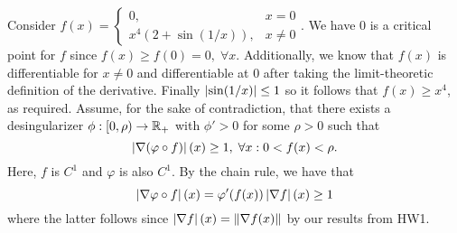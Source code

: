 \documentclass[10pt]{article}
\begin{document}
Consider $f(x) = \begin{cases}
    0, & x = 0 \\
    x^4(2 + \sin(1/x)), & x \neq 0
\end{cases}$. We have $0$ is a critical point for $f$ since $f(x) \geq f(0) =
0, \; \forall x$. Additionally, we know that $f(x)$ is differentiable for $x
\neq 0$ and differentiable at $0$ after taking the limit-theoretic definition
of the derivative. Finally $\left| \sin(1/x) \right| \leq 1$ so it follows that $f(x)
\geq x^4$, as required. Assume, for the sake of contradiction, that there
exists a desingularizer $\phi: [0, \rho)
\to \mathbb{R}_+$ with $\phi' > 0$ for some $\rho > 0$ such that
\[
    \left| \nabla (\varphi \circ f) \right|(x) \geq 1, \; \forall x: 0 < f(x)
    < \rho.
\]
Here, $f$ is $C^1$ and $\varphi$ is also $C^1$. By the chain rule, we have that
\[
    \left| \nabla \varphi \circ f \right|(x) = \varphi'(f(x) )\left| \nabla f \right|(x) \geq 1
\]
where the latter follows since $\left| \nabla f \right|(x) = \left \| \nabla f(x) \right \|$ by our
results from HW1.
\end{document}
